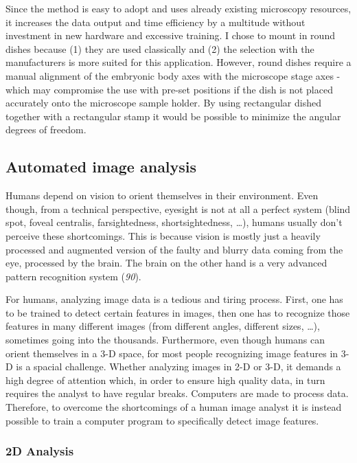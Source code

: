 \documentclass[10pt, b5paper, singlespacinge, twoside]{reedthesis} %
\theoremstyle{definition}
\theoremstyle{definition}
\theoremstyle{definition}
\theoremstyle{remark}
\begin{document}
Since the method is easy to adopt and uses already existing microscopy resources, it increases the data output and time efficiency by a multitude without investment in new hardware and excessive training. I chose to mount in round dishes because (1) they are used classically and (2) the selection with the manufacturers is more suited for this application. However, round dishes require a manual alignment of the embryonic body axes with the microscope stage axes - which may compromise the use with pre-set positions if the dish is not placed accurately onto the microscope sample holder. By using rectangular dished together with a rectangular stamp it would be possible to minimize the angular degrees of freedom.

\hypertarget{automated-image-analysis}{%
\subsection{Automated image analysis}\label{automated-image-analysis}}

Humans depend on vision to orient themselves in their environment. Even though, from a technical perspective, eyesight is not at all a perfect system (blind spot, foveal centralis, farsightedness, shortsightedness, \ldots), humans usually don't perceive these shortcomings. This is because vision is mostly just a heavily processed and augmented version of the faulty and blurry data coming from the eye, processed by the brain. The brain on the other hand is a very advanced pattern recognition system (\emph{90}).

For humans, analyzing image data is a tedious and tiring process. First, one has to be trained to detect certain features in images, then one has to recognize those features in many different images (from different angles, different sizes, \ldots), sometimes going into the thousands. Furthermore, even though humans can orient themselves in a 3-D space, for most people recognizing image features in 3-D is a spacial challenge. Whether analyzing images in 2-D or 3-D, it demands a high degree of attention which, in order to ensure high quality data, in turn requires the analyst to have regular breaks. Computers are made to process data. Therefore, to overcome the shortcomings of a human image analyst it is instead possible to train a computer program to specifically detect image features.

\hypertarget{d-analysis}{%
\subsubsection{2D Analysis}\label{d-analysis}}
\end{document}
